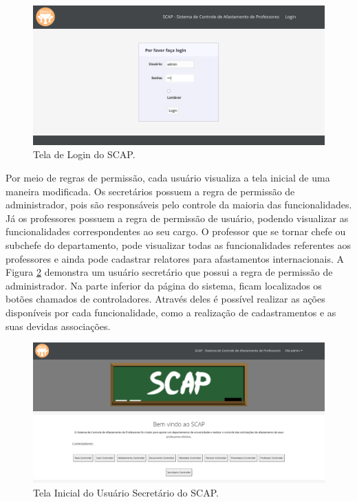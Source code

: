 \begin{figure}[h]
	\centering
	\includegraphics[scale=0.33]{figuras/fig-projeto-login} 
	\caption{Tela de Login do SCAP.}
	\label{fig-projeto-login}
\end{figure}

Por meio de regras de permissão, cada usuário visualiza a tela inicial de uma maneira modificada. Os secretários possuem a regra de permissão de administrador, pois são responsáveis pelo controle da maioria das funcionalidades. Já os professores possuem a regra de permissão de usuário, podendo visualizar as funcionalidades correspondentes ao seu cargo. O professor que se tornar chefe ou subchefe do departamento, pode visualizar todas as funcionalidades referentes aos professores e ainda pode cadastrar relatores para afastamentos internacionais. A Figura \ref{fig-projeto-usuario-secretario} demonstra um usuário secretário que possui a regra de permissão de administrador. Na parte inferior da página do sistema, ficam localizados os botões chamados de controladores. Através deles é possível realizar as ações disponíveis por cada funcionalidade, como a realização de cadastramentos e as suas devidas associações. 

\begin{figure}[h]
	\centering
	\includegraphics[scale=0.33]{figuras/fig-projeto-usuario-secretario} 
	\caption{Tela Inicial do Usuário Secretário do SCAP.}
	\label{fig-projeto-usuario-secretario}
\end{figure}

